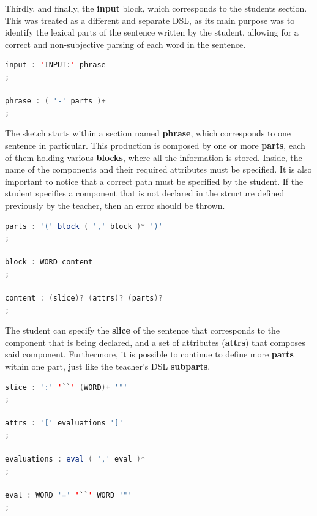 Thirdly, and finally, the \textbf{input} block, which corresponds to the students section. This was treated as a different and separate \textsc{DSL}, as its main purpose was to identify the lexical parts of the sentence written 
by the student, allowing for a correct and non-subjective parsing of each word in the sentence.

\begin{center}
\begin{minipage}{8cm}
\begin{lstlisting}[language=java, basicstyle=\small, label={lst:dsl_input_prod}, caption=DSL input production]
input : 'INPUT:' phrase 
;

phrase : ( '-' parts )+
;
\end{lstlisting}
\end{minipage}
\end{center}

The sketch starts within a section named \textbf{phrase}, which corresponds to one sentence in particular. 
This production is composed by one or more \textbf{parts}, each of them holding various \textbf{blocks}, where all the information is stored. 
Inside, the name of the components and their required attributes must be specified. 
It is also important to notice that a correct path must be specified by the student. 
If the student specifies a component that is not declared in the structure defined previously by the teacher, then an error should be thrown.

\begin{center}
\begin{minipage}{10cm}
\begin{lstlisting}[language=java, basicstyle=\small, label={lst:dsl_parts_prod}, caption=DSL parts/component/content productions]
parts : '(' block ( ',' block )* ')'
;

block : WORD content
;

content : (slice)? (attrs)? (parts)?
;
\end{lstlisting}
\end{minipage}
\end{center}

The student can specify the \textbf{slice} of the sentence that corresponds to the component that is being declared, and a set of attributes (\textbf{attrs}) that composes said component. Furthermore, it is possible to continue to define more \textbf{parts} within one part, just like the teacher's \textsc{DSL} \textbf{subparts}.

\begin{center}
\begin{minipage}{11cm}
\begin{lstlisting}[language=java, basicstyle=\small, label={lst:dsl_slice_prod}, caption=DSL slice/attrs/evaluations/eval productions]
slice : ':' '``' (WORD)+ '"'
;

attrs : '[' evaluations ']'
;

evaluations : eval ( ',' eval )*
;

eval : WORD '=' '``' WORD '"'
;
\end{lstlisting}
\end{minipage}
\end{center}

